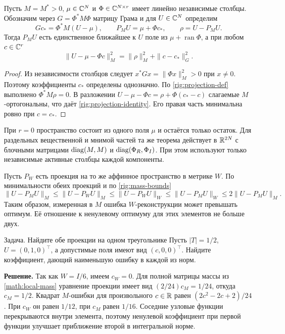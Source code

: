 \begin{theorem}
Пусть $M=M^*>0$, $\mu\in\mathbb{C}^N$ и $\Phi\in\mathbb{C}^{N\times r}$ имеет
линейно независимые столбцы. Обозначим через $G=\Phi^*M\Phi$ матрицу
Грама и для $U\in\mathbb{C}^N$ определим
\begin{equation}
 Gc_*=\Phi^*M(U-\mu),\qquad P_MU=\mu+\Phi c_*,\qquad
 \rho=U-P_MU.\label{rig:projection-def}
\end{equation}
Тогда $P_MU$ есть единственное ближайшее к $U$ поле из
$\mu+\operatorname{ran}\Phi$, а при любом $c\in\mathbb{C}^r$
\begin{equation}
 \|U-\mu-\Phi c\|_M^2=\|\rho\|_M^2+\|c-c_*\|_G^2.
 \label{rig:projection-identity}
\end{equation}
\end{theorem}
\begin{proof}
Из независимости столбцов следует $x^*Gx=\|\Phi x\|_M^2>0$ при $x\ne0$.
Поэтому коэффициенты $c_*$ определены однозначно. По
\eqref{rig:projection-def} выполнено $\Phi^*M\rho=0$.
В разложении $U-\mu-\Phi c=\rho+\Phi(c_*-c)$ слагаемые
$M$-ортогональны, что даёт \eqref{rig:projection-identity}.
Его правая часть минимальна ровно при $c=c_*$.
\end{proof}
При $r=0$ пространство состоит из одного поля $\mu$ и остаётся только
остаток. Для раздельных вещественной и мнимой частей та же теорема
действует в $\mathbb{R}^{2N}$ с блочными матрицами $\operatorname{diag}(M,M)$ и
$\operatorname{diag}(\Phi_R,\Phi_I)$. При этом используют только независимые
активные столбцы каждой компоненты.

Пусть $P_W$ есть проекция на то же аффинное пространство в метрике $W$.
По минимальности обеих проекций и по \eqref{rig:mass-bounds}
\begin{equation}
 \|U-P_MU\|_M\le\|U-P_WU\|_M\le\|U-P_WU\|_W
 \le\|U-P_MU\|_W\le2\|U-P_MU\|_M.\label{rig:lumped-quasi}
\end{equation}
Таким образом, измеренная в $M$ ошибка $W$-реконструкции может превышать
оптимум. Её отношение к ненулевому оптимуму для этих элементов не больше двух.

\begin{worked}{Задача. Найдите обе проекции на одном треугольнике}
Пусть $|T|=1/2$, $U=(0,1,0)^\top$, а допустимые поля имеют вид
$(c,0,0)^\top$. Найдите коэффициент, дающий наименьшую ошибку в каждой
из норм.

\textbf{Решение.} Так как $W=I/6$, имеем $c_W=0$. Для полной матрицы
массы из \eqref{math:local-mass} уравнение проекции имеет вид
$(2/24)c_M=1/24$, откуда $c_M=1/2$. Квадрат $M$-ошибки для произвольного
$c\in\mathbb{R}$ равен $(2c^2-2c+2)/24$. При $c_W$ он равен $1/12$, при $c_M$
равен $1/16$. Соседние узловые функции перекрываются внутри элемента,
поэтому ненулевой коэффициент при первой функции улучшает приближение
второй в интегральной норме.
\end{worked}

